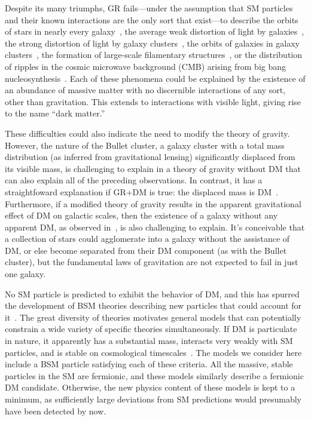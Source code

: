 Despite its many triumphs, GR fails---under the assumption that SM particles and their known interactions are the only sort that exist---to describe the orbits of stars in nearly every galaxy~\cite{ref:nature25767},
the average weak distortion of light by galaxies~\cite{ref:weaklensing}, the strong distortion of light by galaxy clusters~\cite{ref:mnras/stw3385}, the orbits of galaxies in galaxy clusters~\cite{ref:annurev-astro-081710-102514},
the formation of large-scale filamentary structures~\cite{ref:nature03597}, or the distribution of ripples in the cosmic microwave background (CMB) arising from big bang nucleosynthesis~\cite{ref:planck2018_cosparams}.
Each of these phenomena could be explained by the existence of an abundance of massive matter with no discernible interactions of any sort, other than gravitation.
This extends to interactions with visible light, giving rise to the name ``dark matter.''

These difficulties could also indicate the need to modify the theory of gravity.
However, the nature of the Bullet cluster, a galaxy cluster with a total mass distribution (as inferred from gravitational lensing) significantly displaced from its visible mass,
is challenging to explain in a theory of gravity without DM that can also explain all of the preceding observations.
In contrast, it has a straightfoward explanation if GR+DM is true: the displaced mass is DM~\cite{ref:508162}. Furthermore, if a modified theory of gravity
results in the apparent gravitational effect of DM on galactic scales, then the existence of a galaxy without any apparent DM, as observed in~\cite{ref:nature25767}, is
also challenging to explain. It's conceivable that a collection of stars could agglomerate into a galaxy without the assistance of DM, or else become separated from their
DM component (as with the Bullet cluster), but the fundamental laws of gravitation are not expected to fail in just one galaxy.

No SM particle is predicted to exhibit the behavior of DM, and this has spurred the development
of BSM theories describing new particles that could account for it~\cite{ref:s41550-017-0059, ref:j.physrep.2004.08.031, ref:annurev.nucl.54.070103.181244, ref:S1062798717000783}.
The great diversity of theories motivates general models that can potentially constrain a wide variety of specific theories simultaneously.
If DM is particulate in nature, it apparently has a substantial mass, interacts very weakly with SM particles, and is stable on cosmological timescales~\cite{}.
The models we consider here include a BSM particle satisfying each of these criteria.
All the massive, stable particles in the SM are fermionic, and these models similarly describe a fermionic DM candidate. Otherwise, the new physics
content of these models is kept to a minimum, as sufficiently large deviations from SM predictions would presumably have been detected by now.

